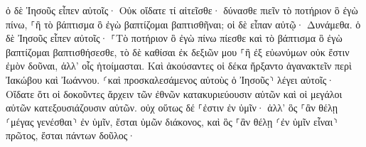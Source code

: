 \documentclass{openreader}
\begin{document}
ὁ δὲ Ἰησοῦς εἶπεν αὐτοῖς· Οὐκ οἴδατε τί αἰτεῖσθε· δύνασθε πιεῖν τὸ ποτήριον ὃ ἐγὼ πίνω, ⸀ἢ τὸ βάπτισμα ὃ ἐγὼ βαπτίζομαι βαπτισθῆναι; 
οἱ δὲ εἶπαν αὐτῷ· Δυνάμεθα. ὁ δὲ Ἰησοῦς εἶπεν αὐτοῖς· ⸀Τὸ ποτήριον ὃ ἐγὼ πίνω πίεσθε καὶ τὸ βάπτισμα ὃ ἐγὼ βαπτίζομαι βαπτισθήσεσθε, 
τὸ δὲ καθίσαι ἐκ δεξιῶν μου ⸀ἢ ἐξ εὐωνύμων οὐκ ἔστιν ἐμὸν δοῦναι, ἀλλ’ οἷς ἡτοίμασται. 
Καὶ ἀκούσαντες οἱ δέκα ἤρξαντο ἀγανακτεῖν περὶ Ἰακώβου καὶ Ἰωάννου. 
⸂καὶ προσκαλεσάμενος αὐτοὺς ὁ Ἰησοῦς⸃ λέγει αὐτοῖς· Οἴδατε ὅτι οἱ δοκοῦντες ἄρχειν τῶν ἐθνῶν κατακυριεύουσιν αὐτῶν καὶ οἱ μεγάλοι αὐτῶν κατεξουσιάζουσιν αὐτῶν. 
οὐχ οὕτως δέ ⸀ἐστιν ἐν ὑμῖν· ἀλλ’ ὃς ⸀ἂν θέλῃ ⸂μέγας γενέσθαι⸃ ἐν ὑμῖν, ἔσται ὑμῶν διάκονος, 
καὶ ὃς ⸀ἂν θέλῃ ⸂ἐν ὑμῖν εἶναι⸃ πρῶτος, ἔσται πάντων δοῦλος· 
\end{document}
